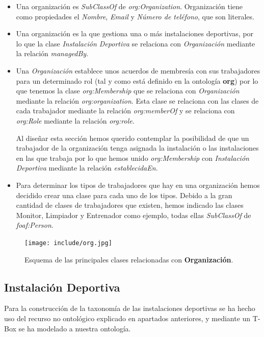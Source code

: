 \documentclass[a4paper,12pt]{article}
\begin{document}
	\begin{itemize}
		\item Una organización es \textit{SubClassOf} de \textit{org:Organization}. Organización tiene como propiedades el \textit{Nombre}, \textit{Email} y \textit{Número de teléfono}, que son literales.
		\item Una organización es la que gestiona una o más instalaciones deportivas, por lo que la clase \textit{Instalación Deportiva} se relaciona con \textit{Organización} mediante la relación \textit{managedBy}.
		\item Una \textit{Organización} establece unos acuerdos de membresía con sus trabajadores para un determinado rol (tal y como está definido en la ontología \textbf{org}) por lo que tenemos la clase \textit{org:Membership} que se relaciona con \textit{Organización} mediante la relación \textit{org:organization}. Esta clase se relaciona con las clases de cada trabajador mediante la relación \textit{org:memberOf} y se relaciona con \textit{org:Role} mediante la relación \textit{org:role}.
		
		Al diseñar esta sección hemos querido contemplar la posibilidad de que un trabajador de la organización tenga asignada la instalación o las instalaciones en las que trabaja por lo que hemos unido \textit{org:Membership} con \textit{Instalación Deportiva} mediante la relación \textit{establecidaEn}.
		\item Para determinar los tipos de trabajadores que hay en una organización hemos decidido crear una clase para cada uno de los tipos. Debido a la gran cantidad de clases de trabajadores que existen, hemos indicado las clases Monitor, Limpiador y Entrenador como ejemplo, todas ellas \textit{SubClassOf} de \textit{foaf:Person}.
	\end{itemize}

	\begin{figure}[H]
		\centering
		\texttt{[image: include/org.jpg]}
		\caption{Esquema de las principales clases relacionadas con \textbf{Organización}.}
	\end{figure}
	
	\subsection{Instalación Deportiva}
	
	Para la construcción de la taxonomía de las instalaciones deportivas se ha hecho uso del recurso no ontológico explicado en apartados anteriores, y mediante un T-Box se ha modelado a nuestra ontología.
	
\end{document}
